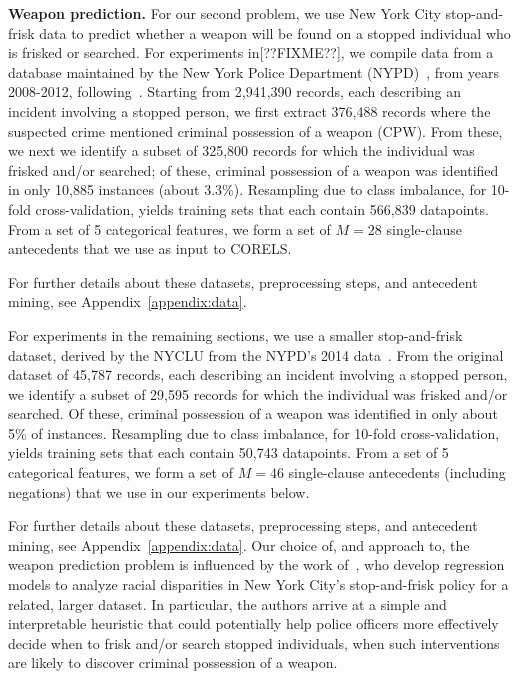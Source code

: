 \textbf{Weapon prediction.} For our second problem, we use New York City
stop-and-frisk data to predict whether a weapon will be found on a stopped
individual who is frisked or searched.
%
For experiments in[??FIXME??],
we compile data from a database maintained by the New York Police Department (NYPD)~\citep{nypd},
from years 2008-2012, following~\citet{Goel16}.
%
Starting from 2,941,390 records, each describing an incident involving
a stopped person, we first extract 376,488 records where the suspected
crime mentioned criminal possession of a weapon (CPW).
%
From these, we next we identify a subset of 325,800 records for which the
individual was frisked and/or searched; of these, criminal possession of a weapon
was identified in only 10,885 instances (about 3.3\%).
%
Resampling due to class imbalance, for 10-fold cross-validation, yields training sets
that each contain 566,839 datapoints.
%
From a set of 5 categorical features, we form a set of ${M=28}$ single-clause antecedents
that we use as input to CORELS.

For further details about these datasets, preprocessing steps, and antecedent mining,
see Appendix~\ref{appendix:data}.

For experiments in the remaining sections, we use a smaller stop-and-frisk dataset,
derived by the NYCLU from the NYPD's 2014 data~\citep{nyclu:2014}.
%
From the original dataset of 45,787 records, each describing an incident involving
a stopped person, we identify a subset of 29,595 records for which the individual
was frisked and/or searched.
%
Of these, criminal possession of a weapon was identified in only about 5\% of instances.
%
Resampling due to class imbalance, for 10-fold cross-validation, yields training sets
that each contain 50,743 datapoints.
%
From a set of 5 categorical features, we form a set of ${M=46}$ single-clause antecedents (including negations)
that we use in our experiments below.

For further details about these datasets, preprocessing steps, and antecedent mining,
see Appendix~\ref{appendix:data}.
%
Our choice of, and approach to, the weapon prediction problem is influenced by the work
of~\citet{Goel16}, who develop regression models to analyze racial disparities
in New York City's stop-and-frisk policy for a related, larger dataset.
%
In particular, the authors arrive at a simple and interpretable heuristic that
could potentially help police officers more effectively decide when to
frisk and/or search stopped individuals, \ie when such
interventions are likely to discover criminal possession of a weapon.

